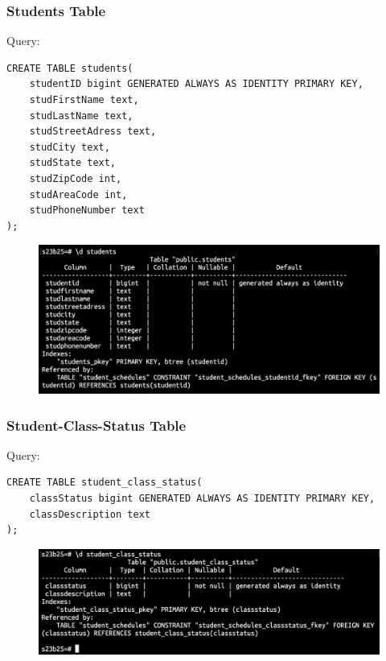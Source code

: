 \documentclass{article}
\begin{document}
\subsubsection*{Students Table}
Query:
\begin{Verbatim}[frame=single,framerule=1pt,fontfamily=courier,fontsize=\small]
CREATE TABLE students(
    studentID bigint GENERATED ALWAYS AS IDENTITY PRIMARY KEY,
    studFirstName text,
    studLastName text,
    studStreetAdress text,
    studCity text,
    studState text,
    studZipCode int,
    studAreaCode int,
    studPhoneNumber text
);
\end{Verbatim}
\begin{figure}[h]
    \centering
    \includegraphics[width=\textwidth]{./o_11_students.png}
\end{figure}

\subsubsection*{Student-Class-Status Table}
Query:
\begin{Verbatim}[frame=single,framerule=1pt,fontfamily=courier,fontsize=\small]
CREATE TABLE student_class_status(
    classStatus bigint GENERATED ALWAYS AS IDENTITY PRIMARY KEY,
    classDescription text
);
\end{Verbatim}
\begin{figure}[h]
    \centering
    \includegraphics[width=\textwidth]{./o_12_student_class_status.png}
\end{figure}
\end{document}
